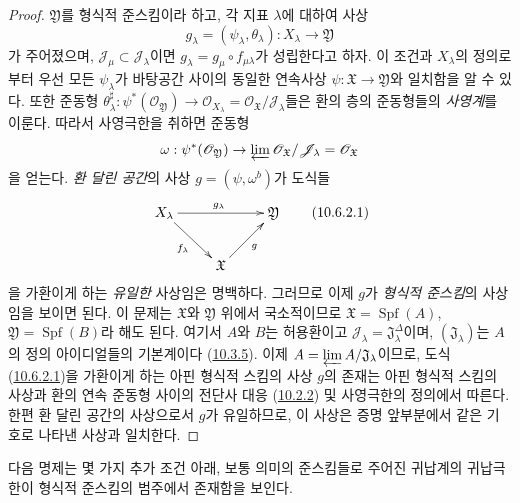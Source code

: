 \begin{proof}
$\mathfrak{Y}$를 형식적 준스킴이라 하고, 각 지표 $\lambda$에 대하여
사상
\[
  g_\lambda=(\psi_\lambda,\theta_\lambda):X_\lambda\to\mathfrak{Y}
\]
가 주어졌으며, $\mathscr{J}_\mu\subset\mathscr{J}_\lambda$이면
$g_\lambda=g_\mu\circ f_{\mu\lambda}$가 성립한다고 하자. 이 조건과
$X_\lambda$의 정의로부터 우선 모든 $\psi_\lambda$가 바탕공간 사이의
동일한 연속사상 $\psi:\mathfrak{X}\to\mathfrak{Y}$와 일치함을 알 수 있다.
또한 준동형
$\theta_\lambda^\sharp:\psi^*(\mathscr{O}_{\mathfrak{Y}})\to
\mathscr{O}_{X_\lambda}=
\mathscr{O}_{\mathfrak{X}}/\mathscr{J}_\lambda$들은 환의 층의 준동형들의
\emph{사영계}를 이룬다. 따라서 사영극한을 취하면 준동형
\[
  \omega:\psi^*(\mathscr{O}_{\mathfrak{Y}})\to
  \varprojlim\mathscr{O}_{\mathfrak{X}}/\mathscr{J}_\lambda
  =\mathscr{O}_{\mathfrak{X}}
\]
을 얻는다. \emph{환 달린 공간}의 사상 $g=(\psi,\omega^b)$가 도식들
\[
  \label{I.10.6.2.1-ko}
  \xymatrix{
    X_\lambda\ar[rr]^{g_\lambda}\ar[rd]_{f_\lambda} &&
    \mathfrak{Y}\\
    & \mathfrak{X}\ar[ru]_g
  }
  \tag{10.6.2.1}
\]
을 가환이게 하는 \emph{유일한} 사상임은 명백하다. 그러므로 이제 $g$가
\emph{형식적 준스킴}의 사상임을 보이면 된다. 이 문제는
$\mathfrak{X}$와 $\mathfrak{Y}$ 위에서 국소적이므로
$\mathfrak{X}=\operatorname{Spf}(A)$,
$\mathfrak{Y}=\operatorname{Spf}(B)$라 해도 된다. 여기서 $A$와 $B$는
허용환이고 $\mathscr{J}_\lambda=\mathfrak{J}_\lambda^{\Delta}$이며,
$(\mathfrak{J}_\lambda)$는 $A$의 정의 아이디얼들의 기본계이다
(\hyperref[I.10.3.5-ko]{10.3.5}). 이제
$A=\varprojlim A/\mathfrak{J}_\lambda$이므로, 도식
(\hyperref[I.10.6.2.1-ko]{10.6.2.1})을 가환이게 하는 아핀 형식적
스킴의 사상 $g$의 존재는 아핀 형식적 스킴의 사상과 환의 연속
준동형 사이의 전단사 대응 (\hyperref[I.10.2.2-ko]{10.2.2}) 및
사영극한의 정의에서 따른다. 한편 환 달린 공간의 사상으로서 $g$가
유일하므로, 이 사상은 증명 앞부분에서 같은 기호로 나타낸 사상과
일치한다.
\end{proof}

다음 명제는 몇 가지 추가 조건 아래, 보통 의미의 준스킴들로 주어진
귀납계의 귀납극한이 형식적 준스킴의 범주에서 존재함을 보인다.

